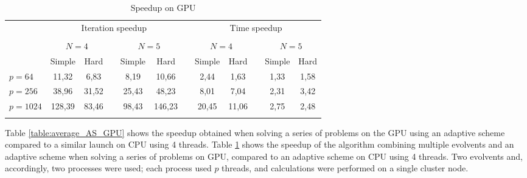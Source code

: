 \documentclass{svproc}
\begin{document}
\begin{table}
                \caption{Speedup on GPU}
                \label{table:average_MMAS_GPU}
                \center
                \begin{tabular}{lccccccccccc}
                & \multicolumn{5}{c}{ Iteration speedup} & & \multicolumn{5}{c}{ Time speedup}\\
                               \noalign{\smallskip} \cline{2-6} \cline{8-12}  \\
                               & \multicolumn{2}{c}{ $N=4$ } & & \multicolumn{2}{c}{$N=5$} &  & \multicolumn{2}{c}{ $N=4$ } & & \multicolumn{2}{c}{$N=5$} \\
                               \noalign{\smallskip} \cline{2-3} \cline{5-6}  \cline{8-9} \cline{11-12} \noalign{\smallskip}
                               & Simple & Hard & & Simple & Hard &  & Simple & Hard & & Simple & Hard  \\
                               \noalign{\smallskip} \hline \noalign{\smallskip}                               
                               $p=64$  &    11,32	 & 6,83	 &   & 8,19	     & 10,66  &   & 2,44	 & 1,63	 &   & 1,33	 & 1,58 \\
                               $p=256$ &    38,96	 & 31,52 &   & 25,43	 & 48,23  &   & 8,01	 & 7,04	 &   & 2,31	 & 3,42 \\
							   $p=1024$&    128,39	 & 83,46 &   & 98,43	 & 146,23 &   & 20,45	 & 11,06 &   & 2,75	 & 2,48 \\
                               \noalign{\smallskip}\hline
                \end{tabular}
\end{table}


Table \ref{table:average_AS_GPU} shows the speedup obtained when solving a series of problems on the GPU using an adaptive scheme compared to a similar launch on CPU using 4 threads. Table \ref{table:average_MMAS_GPU} shows the speedup of the algorithm combining multiple evolvents and an adaptive scheme when solving a series of problems on GPU, compared to an adaptive scheme on CPU using 4 threads. Two evolvents and, accordingly, two processes were used; each process used $p$ threads, and calculations were performed on a single cluster node.
\end{document}
